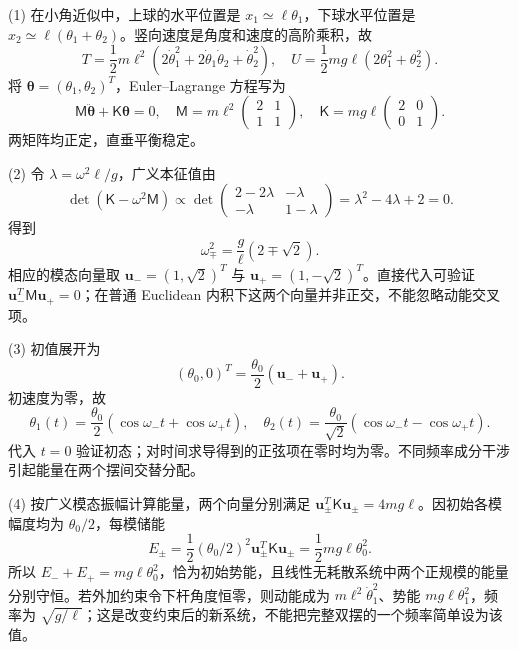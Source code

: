 (1) 在小角近似中，上球的水平位置是 \(x_1\simeq\ell\theta_1\)，下球水平位置是 \(x_2\simeq\ell(\theta_1+\theta_2)\)。竖向速度是角度和速度的高阶乘积，故
\[
T=\frac12m\ell^2(2\dot\theta_1^2+2\dot\theta_1\dot\theta_2+\dot\theta_2^2),
\quad U=\frac12mg\ell(2\theta_1^2+\theta_2^2).
\]
将 \(\boldsymbol\theta=(\theta_1,\theta_2)^T\)，Euler–Lagrange 方程写为
\[
\mathsf M\ddot{\boldsymbol\theta}+\mathsf K\boldsymbol\theta=0,
\quad\mathsf M=m\ell^2\begin{pmatrix}2&1\\1&1\end{pmatrix},
\quad\mathsf K=mg\ell\begin{pmatrix}2&0\\0&1\end{pmatrix}.
\]
两矩阵均正定，直垂平衡稳定。

(2) 令 \(\lambda=\omega^2\ell/g\)，广义本征值由
\[
\det(\mathsf K-\omega^2\mathsf M)
\propto\det\begin{pmatrix}2-2\lambda&-\lambda\\-\lambda&1-\lambda\end{pmatrix}
=\lambda^2-4\lambda+2=0.
\]
得到
\[
\omega_\mp^2=\frac g\ell(2\mp\sqrt2).
\]
相应的模态向量取 \(\boldsymbol u_-=(1,\sqrt2)^T\) 与 \(\boldsymbol u_+=(1,-\sqrt2)^T\)。直接代入可验证 \(\boldsymbol u_-^T\mathsf M\boldsymbol u_+=0\)；在普通 Euclidean 内积下这两个向量并非正交，不能忽略动能交叉项。

(3) 初值展开为
\[
(\theta_0,0)^T=\frac{\theta_0}{2}(\boldsymbol u_-+\boldsymbol u_+).
\]
初速度为零，故
\[
\theta_1(t)=\frac{\theta_0}{2}(\cos\omega_-t+\cos\omega_+t),
\quad
\theta_2(t)=\frac{\theta_0}{\sqrt2}(\cos\omega_-t-\cos\omega_+t).
\]
代入 \(t=0\) 验证初态；对时间求导得到的正弦项在零时均为零。不同频率成分干涉引起能量在两个摆间交替分配。

(4) 按广义模态振幅计算能量，两个向量分别满足 \(\boldsymbol u_\pm^T\mathsf K\boldsymbol u_\pm=4mg\ell\)。因初始各模幅度均为 \(\theta_0/2\)，每模储能
\[
E_\pm=\frac12(\theta_0/2)^2\boldsymbol u_\pm^T\mathsf K\boldsymbol u_\pm
=\frac12mg\ell\theta_0^2.
\]
所以 \(E_-+E_+=mg\ell\theta_0^2\)，恰为初始势能，且线性无耗散系统中两个正规模的能量分别守恒。若外加约束令下杆角度恒零，则动能成为 \(m\ell^2\dot\theta_1^2\)、势能 \(mg\ell\theta_1^2\)，频率为 \(\sqrt{g/\ell}\)；这是改变约束后的新系统，不能把完整双摆的一个频率简单设为该值。
